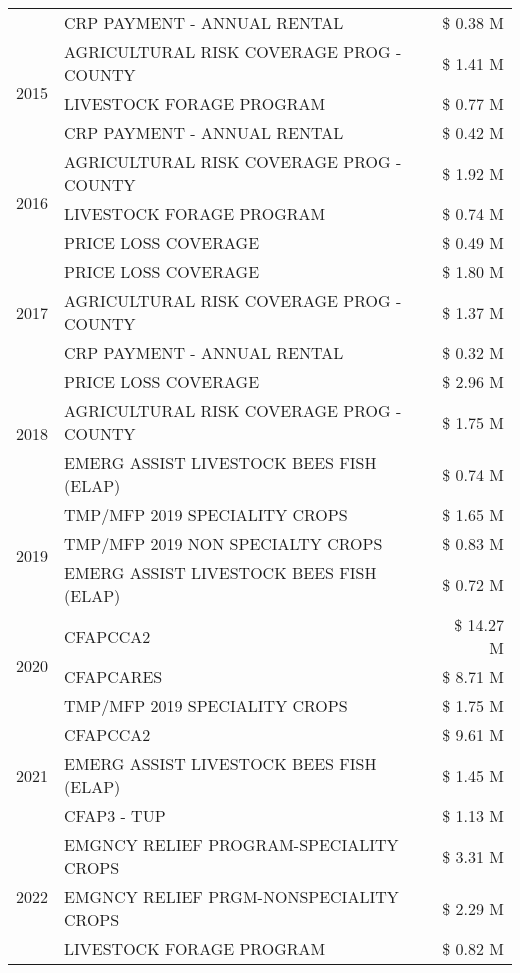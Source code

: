 \begin{tabular}{llr}
 & CRP PAYMENT - ANNUAL RENTAL & \$ 0.38 M \\
\cline{1-3}
\multirow[t]{3}{*}{2015} & AGRICULTURAL RISK COVERAGE PROG - COUNTY & \$ 1.41 M \\
 & LIVESTOCK FORAGE PROGRAM & \$ 0.77 M \\
 & CRP PAYMENT - ANNUAL RENTAL & \$ 0.42 M \\
\cline{1-3}
\multirow[t]{3}{*}{2016} & AGRICULTURAL RISK COVERAGE PROG - COUNTY & \$ 1.92 M \\
 & LIVESTOCK FORAGE PROGRAM & \$ 0.74 M \\
 & PRICE LOSS COVERAGE & \$ 0.49 M \\
\cline{1-3}
\multirow[t]{3}{*}{2017} & PRICE LOSS COVERAGE & \$ 1.80 M \\
 & AGRICULTURAL RISK COVERAGE PROG - COUNTY & \$ 1.37 M \\
 & CRP PAYMENT - ANNUAL RENTAL & \$ 0.32 M \\
\cline{1-3}
\multirow[t]{3}{*}{2018} & PRICE LOSS COVERAGE & \$ 2.96 M \\
 & AGRICULTURAL RISK COVERAGE PROG - COUNTY & \$ 1.75 M \\
 & EMERG ASSIST LIVESTOCK BEES FISH (ELAP) & \$ 0.74 M \\
\cline{1-3}
\multirow[t]{3}{*}{2019} & TMP/MFP 2019 SPECIALITY CROPS & \$ 1.65 M \\
 & TMP/MFP 2019 NON SPECIALTY CROPS & \$ 0.83 M \\
 & EMERG ASSIST LIVESTOCK BEES FISH (ELAP) & \$ 0.72 M \\
\cline{1-3}
\multirow[t]{3}{*}{2020} & CFAPCCA2 & \$ 14.27 M \\
 & CFAPCARES & \$ 8.71 M \\
 & TMP/MFP 2019 SPECIALITY CROPS & \$ 1.75 M \\
\cline{1-3}
\multirow[t]{3}{*}{2021} & CFAPCCA2 & \$ 9.61 M \\
 & EMERG ASSIST LIVESTOCK BEES FISH (ELAP) & \$ 1.45 M \\
 & CFAP3 - TUP & \$ 1.13 M \\
\cline{1-3}
\multirow[t]{3}{*}{2022} & EMGNCY RELIEF PROGRAM-SPECIALITY CROPS & \$ 3.31 M \\
 & EMGNCY RELIEF PRGM-NONSPECIALITY CROPS & \$ 2.29 M \\
 & LIVESTOCK FORAGE PROGRAM & \$ 0.82 M \\
\cline{1-3}
\bottomrule
\end{tabular}
